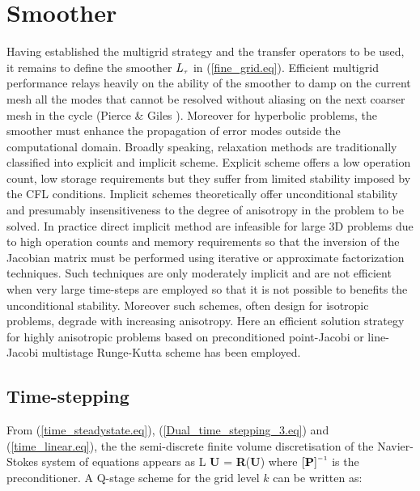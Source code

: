 \section{Smoother}
%
 Having established the multigrid strategy and the transfer operators
 to be used, it remains to define the smoother $L_{\mbox{\tiny $\tau$}}$ in (\ref{fine_grid.eq}).
 Efficient multigrid performance  relays heavily on the ability of
 the smoother to damp on the current mesh all the modes
 that cannot be resolved without aliasing on the next coarser mesh
 in the cycle (Pierce \& Giles ). Moreover for
 hyperbolic problems, the smoother must enhance the propagation of
 error modes outside the computational domain.
 Broadly speaking, relaxation methods are traditionally classified into
 explicit and implicit scheme. Explicit scheme offers a low operation count,
 low storage requirements but they suffer from limited stability imposed by
 the CFL conditions. Implicit schemes theoretically offer unconditional
 stability and presumably insensitiveness to the degree of anisotropy in
 the problem to be solved.
 In practice direct implicit method are infeasible for large 3D problems due
 to high operation counts and memory requirements so that the inversion
 of the Jacobian matrix must be performed using iterative or approximate
 factorization techniques.
 Such techniques are only moderately implicit and are not efficient when
 very large time-steps are employed so that it is not possible to benefits
 the unconditional stability. Moreover such schemes, often design for
 isotropic problems, degrade with increasing anisotropy.
 Here an efficient solution strategy for highly anisotropic problems
 based on preconditioned point-Jacobi or line-Jacobi multistage Runge-Kutta scheme
 has been employed.
%
%
%
\subsection{Time-stepping}
%
 From (\ref{time_steadystate.eq}), (\ref{Dual_time_stepping_3.eq}) and
 (\ref{time_linear.eq}), the the semi-discrete finite
 volume discretisation of the Navier-Stokes system of equations appears as
%
\beq
  \left[{\bf P}\right] L\sm{\tau} {\bf U} =
  {\bf R}\left({\bf U}\right)
 \label{Time_stepping_1.eq}
\eeq
%
 where $\left[{\bf P}\right]^{\mbox{\tiny $-1$}}$ is the preconditioner.
 A Q-stage scheme for the grid level $k$ can be written as:

